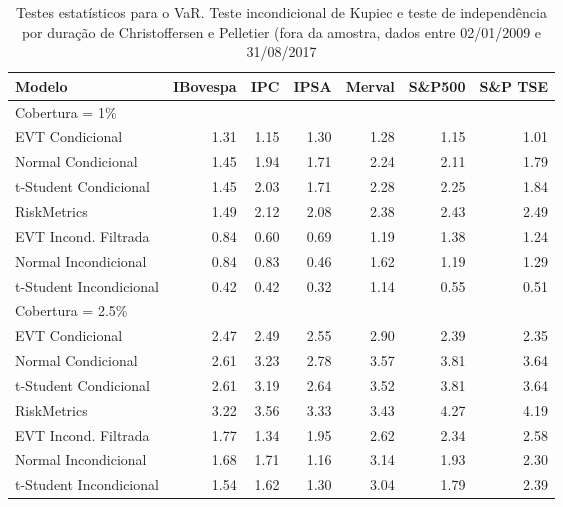 \begin{table}[H]
\centering
\caption{Testes estatísticos para o VaR. Teste incondicional de Kupiec e teste de
             independência por duração de Christoffersen e Pelletier (fora da amostra, 
             dados entre 02/01/2009 e 31/08/2017} 
\label{tab:vartest}
\begin{tabular}{lrrrrrr}
  \hline
Modelo & IBovespa & IPC & IPSA & Merval & S\&P500 & S\&P TSE \\ 
  \hline
Cobertura = 1\% &  &  &  &  &  &  \\ 
  EVT Condicional & 1.31 & 1.15 & 1.30 & 1.28 & 1.15 & 1.01 \\ 
  Normal Condicional & 1.45 & 1.94 & 1.71 & 2.24 & 2.11 & 1.79 \\ 
  t-Student Condicional & 1.45 & 2.03 & 1.71 & 2.28 & 2.25 & 1.84 \\ 
  RiskMetrics & 1.49 & 2.12 & 2.08 & 2.38 & 2.43 & 2.49 \\ 
  EVT Incond. Filtrada & 0.84 & 0.60 & 0.69 & 1.19 & 1.38 & 1.24 \\ 
  Normal Incondicional & 0.84 & 0.83 & 0.46 & 1.62 & 1.19 & 1.29 \\ 
  t-Student Incondicional & 0.42 & 0.42 & 0.32 & 1.14 & 0.55 & 0.51 \\ 
  Cobertura = 2.5\% &  &  &  &  &  &  \\ 
  EVT Condicional & 2.47 & 2.49 & 2.55 & 2.90 & 2.39 & 2.35 \\ 
  Normal Condicional & 2.61 & 3.23 & 2.78 & 3.57 & 3.81 & 3.64 \\ 
  t-Student Condicional & 2.61 & 3.19 & 2.64 & 3.52 & 3.81 & 3.64 \\ 
  RiskMetrics & 3.22 & 3.56 & 3.33 & 3.43 & 4.27 & 4.19 \\ 
  EVT Incond. Filtrada & 1.77 & 1.34 & 1.95 & 2.62 & 2.34 & 2.58 \\ 
  Normal Incondicional & 1.68 & 1.71 & 1.16 & 3.14 & 1.93 & 2.30 \\ 
  t-Student Incondicional & 1.54 & 1.62 & 1.30 & 3.04 & 1.79 & 2.39 \\ 
   \hline
\end{tabular}
\end{table}
